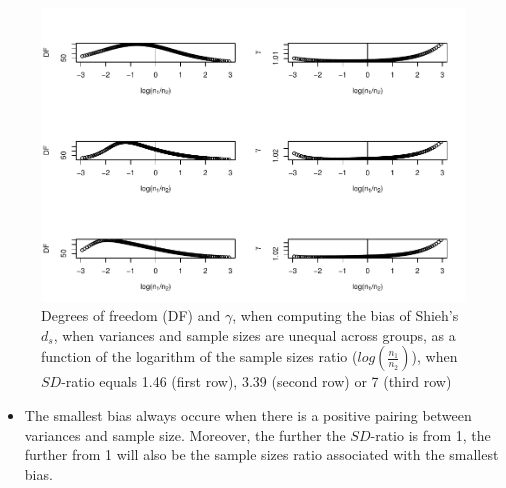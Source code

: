 \documentclass[
  man]{apa6}
\providecommand{\tightlist}{%
  \setlength{\itemsep}{0pt}\setlength{\parskip}{0pt}}
\begin{document}
\begin{figure}
\centering
\includegraphics{Theoretical-Bias-of-all-estimators-as-a-function-of-population-parameters_files/figure-latex/biasshiehhetunbaldfandbias-1.pdf}
\caption{\label{fig:biasshiehhetunbaldfandbias}Degrees of freedom (DF) and \(\gamma\), when computing the bias of Shieh's \(d_s\), when variances and sample sizes are unequal across groups, as a function of the logarithm of the sample sizes ratio (\(log \left( \frac{n_1}{n_2} \right)\)), when \(SD\)-ratio equals 1.46 (first row), 3.39 (second row) or 7 (third row)}
\end{figure}

\begin{itemize}
\tightlist
\item
  The smallest bias always occure when there is a positive pairing between variances and sample size. Moreover, the further the \(SD\)-ratio is from 1, the further from 1 will also be the sample sizes ratio associated with the smallest bias.
\end{itemize}
\end{document}
